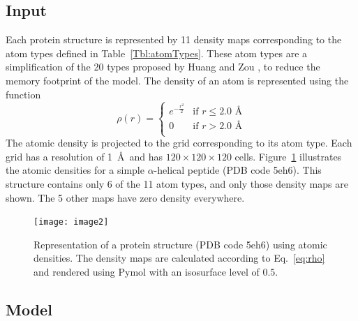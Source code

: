 \documentclass{bioinfo}
\begin{document}
\subsection{Input}

Each protein structure is represented by 11 density maps corresponding
to the atom types defined in Table~\ref{Tbl:atomTypes}. These atom
types are a simplification of the 20 types proposed by Huang and
Zou \citep{huang2006iterative, huang2008iterative}, to reduce the
memory footprint of the model.
The density of an atom is represented using the function
\begin{equation}
\rho(r) =  \begin{cases}
               e^{-\frac{r^2}{2}}&\text{if } r\leq 2.0\text{ \AA} \\
               0                 &\text{if } r>2.0\text{ \AA} \\
            \end{cases}
\label{eq:rho}
\end{equation}
The atomic density is projected to the grid corresponding to its atom
type. Each grid has a resolution of 1~\AA\ and has $120\times
120\times 120$ cells.
%
Figure~\ref{Fig:atomic_densities} illustrates the atomic densities for
a simple $\alpha$-helical peptide (PDB code 5eh6). This structure
contains only 6 of the 11 atom types, and only those density maps are
shown. The 5 other maps have zero density everywhere.

\begin{figure}[t]
    \centerline{\texttt{[image: image2]}}
%
    \vspace{-10pt}
    \caption{Representation of a protein structure (PDB code 5eh6)
    using atomic densities. The density maps are calculated according
    to Eq.~\ref{eq:rho} and rendered using Pymol \citep{PyMOL} with an
    isosurface level of $0.5$.}
%
    \label{Fig:atomic_densities}
\end{figure}


\subsection{Model}
\end{document}
